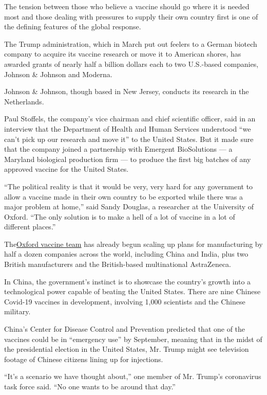 The tension between those who believe a vaccine should go where it is
needed most and those dealing with pressures to supply their own country
first is one of the defining features of the global response.

The Trump administration, which in March put out feelers to a German
biotech company to acquire its vaccine research or move it to American
shores, has awarded grants of nearly half a billion dollars each to two
U.S.-based companies, Johnson \& Johnson and Moderna.

Johnson \& Johnson, though based in New Jersey, conducts its research in
the Netherlands.

Paul Stoffels, the company's vice chairman and chief scientific officer,
said in an interview that the Department of Health and Human Services
understood ``we can't pick up our research and move it'' to the United
States. But it made sure that the company joined a partnership with
Emergent BioSolutions --- a Maryland biological production firm --- to
produce the first big batches of any approved vaccine for the United
States.

``The political reality is that it would be very, very hard for any
government to allow a vaccine made in their own country to be exported
while there was a major problem at home,'' said Sandy Douglas, a
researcher at the University of Oxford. ``The only solution is to make a
hell of a lot of vaccine in a lot of different places.''

The\href{https://www.nytimes.com/2020/04/27/world/europe/coronavirus-vaccine-update-oxford.html}{Oxford
vaccine team} has already begun scaling up plans for manufacturing by
half a dozen companies across the world, including China and India, plus
two British manufacturers and the British-based multinational
AstraZeneca.

In China, the government's instinct is to showcase the country's growth
into a technological power capable of beating the United States. There
are nine Chinese Covid-19 vaccines in development, involving 1,000
scientists and the Chinese military.

China's Center for Disease Control and Prevention predicted that one of
the vaccines could be in ``emergency use'' by September, meaning that in
the midst of the presidential election in the United States, Mr. Trump
might see television footage of Chinese citizens lining up for
injections.

``It's a scenario we have thought about,'' one member of Mr. Trump's
coronavirus task force said. ``No one wants to be around that day.''

